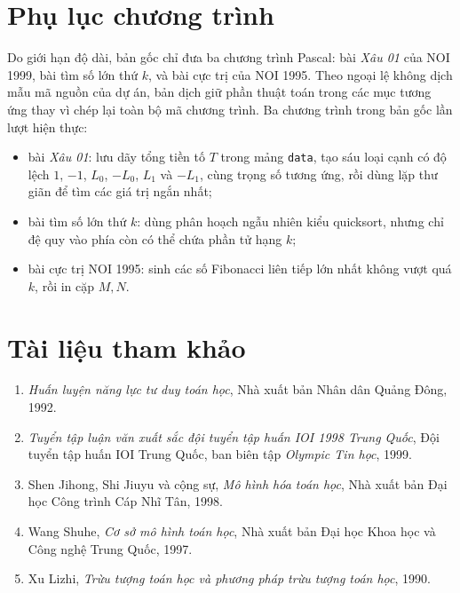 \documentclass[11pt]{article}
\begin{document}
\section*{Phụ lục chương trình}

Do giới hạn độ dài, bản gốc chỉ đưa ba chương trình Pascal: bài \textit{Xâu
01} của NOI 1999, bài tìm số lớn thứ \(k\), và bài cực trị của NOI 1995. Theo
ngoại lệ không dịch mẫu mã nguồn của dự án, bản dịch giữ phần thuật toán trong
các mục tương ứng thay vì chép lại toàn bộ mã chương trình. Ba chương trình
trong bản gốc lần lượt hiện thực:
\begin{itemize}
  \item bài \textit{Xâu 01}: lưu dãy tổng tiền tố \(T\) trong mảng
  \texttt{data}, tạo sáu loại cạnh có độ lệch \(1\), \(-1\), \(L_0\),
  \(-L_0\), \(L_1\) và \(-L_1\), cùng trọng số tương ứng, rồi dùng lặp thư giãn
  để tìm các giá trị ngắn nhất;
  \item bài tìm số lớn thứ \(k\): dùng phân hoạch ngẫu nhiên kiểu quicksort,
  nhưng chỉ đệ quy vào phía còn có thể chứa phần tử hạng \(k\);
  \item bài cực trị NOI 1995: sinh các số Fibonacci liên tiếp lớn nhất không
  vượt quá \(k\), rồi in cặp \(M,N\).
\end{itemize}

\section*{Tài liệu tham khảo}

\begin{enumerate}
  \item \textit{Huấn luyện năng lực tư duy toán học}, Nhà xuất bản Nhân dân
  Quảng Đông, 1992.
  \item \textit{Tuyển tập luận văn xuất sắc đội tuyển tập huấn IOI 1998 Trung
  Quốc}, Đội tuyển tập huấn IOI Trung Quốc, ban biên tập
  \textit{Olympic Tin học}, 1999.
  \item Shen Jihong, Shi Jiuyu và cộng sự, \textit{Mô hình hóa toán học}, Nhà
  xuất bản Đại học Công trình Cáp Nhĩ Tân, 1998.
  \item Wang Shuhe, \textit{Cơ sở mô hình toán học}, Nhà xuất bản Đại học Khoa
  học và Công nghệ Trung Quốc, 1997.
  \item Xu Lizhi, \textit{Trừu tượng toán học và phương pháp trừu tượng toán
  học}, 1990.
\end{enumerate}
\end{document}
